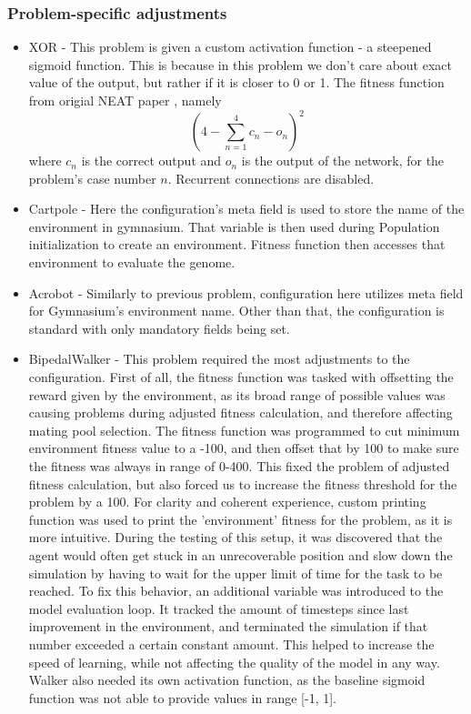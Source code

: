 \documentclass{article}
\begin{document}
        \subsubsection{Problem-specific adjustments}
        \begin{itemize}
            \item XOR - This problem is given a custom activation function - a steepened sigmoid function.
            This is because in this problem we don't care about exact value of the output, but rather if it is closer to 0 or 1.
            The fitness function from origial NEAT paper \cite{originalNeat}, namely $$(4 - \sum_{n=1}^{4}c_n-o_n)^2$$
            where $c_n$ is the correct output and $o_n$ is the output of the network, for the problem's case number $n$.
            Recurrent connections are disabled.
            \item Cartpole - Here the configuration's meta field is used to store the name of the environment in gymnasium. That 
            variable is then used during Population initialization to create an environment. Fitness function then accesses that 
            environment to evaluate the genome.  
            \item Acrobot - Similarly to previous problem, configuration here utilizes meta field for Gymnasium's environment name. 
            Other than that, the configuration is standard with only mandatory fields being set.
            \item BipedalWalker - This problem required the most adjustments to the configuration. First of all, the fitness function 
            was tasked with offsetting the reward given by the environment, as its broad range of possible values was causing
            problems during adjusted fitness calculation, and therefore affecting mating pool selection. The fitness function was 
            programmed to cut minimum environment fitness value to a -100, and then offset that by 100 to make sure the fitness was always in range
            of 0-400. This fixed the problem of adjusted fitness calculation, but also forced us to increase the fitness threshold 
            for the problem by a 100. For clarity and coherent experience, custom printing function was used to print the 'environment' fitness
            for the problem, as it is more intuitive. During the testing of this setup, it was discovered that 
            the agent would often get stuck in an unrecoverable position and slow down the simulation by having to wait for the upper limit of time
            for the task to be reached. To fix this behavior, an additional variable was introduced to the model evaluation loop. It
            tracked the amount of timesteps since last improvement in the environment, and terminated the simulation if that number exceeded 
            a certain constant amount. This helped to increase the speed of learning, while not affecting the quality of the model in any way.
            Walker also needed its own activation function, as the baseline sigmoid function was not able to provide values in range [-1, 1].
            \end{itemize}
\end{document}
